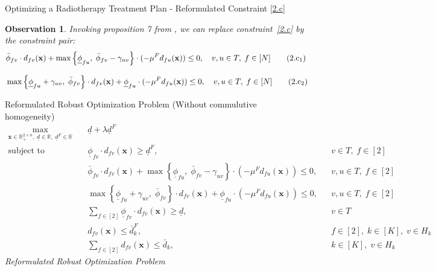 \documentclass[11pt]{beamer}
\newtheorem{customobservation}{Observation}
\begin{document}
\begin{frame}
        {Optimizing a Radiotherapy Treatment Plan - Reformulated Constraint \ref{2.c}}
        \vspace{1em}
        \small{
        \begin{customobservation}
        Invoking proposition 7 from \cite{apte2024robust}, we can replace constraint~\ref{2.c} by the constraint pair:
            \begin{align}
            & \bar{\phi}_{fv} \cdot d_{fv}(\mathbf{x}) +
            \max\left\{ \underline{\phi}_{fu},\; \bar{\phi}_{fv} - \gamma_{uv} \right\}
            \cdot (-\mu^F d_{fu}(\mathbf{x}))
            \le 0, \quad v, u \in T,\; f \in [N]
            \tag{$2.\text{c}_1$} \\[0.8em]
            & \max\left\{ \underline{\phi}_{fu} + \gamma_{uv},\; \bar{\phi}_{fv} \right\}
            \cdot d_{fv}(\mathbf{x}) +
            \underline{\phi}_{fu} \cdot (-\mu^F d_{fu}(\mathbf{x}))
            \le 0, \quad v, u \in T,\; f \in [N]
            \tag{$2.\text{c}_2$}
            \end{align}
        \end{customobservation}
        }
\end{frame}

\begin{frame}{Reformulated Robust Optimization Problem (Without commulutive homogeneity)}
    \vspace{-0.5em}
    \tiny{
    \begin{align}
    \max_{\mathbf{x} \in \mathbb{R}_+^{2 \times n},\; \underline{d} \in \mathbb{R},\; \underline{d}^F \in \mathbb{R}} \quad
    & \underline{d} + \lambda \underline{d}^F \tag{3.a} \\
    \text{subject to} \quad
    & \underline{\phi}_{fv} \cdot d_{fv}(\mathbf{x}) \ge \underline{d}^F,
    && v \in T,\; f \in [2] \tag{3.b} \label{3.b} \\[0.5em]
    & \bar{\phi}_{fv} \cdot d_{fv}(\mathbf{x}) +
    \max\left\{ \underline{\phi}_{fu},\; \bar{\phi}_{fv} - \gamma_{uv} \right\}
    \cdot (-\mu^F d_{fu}(\mathbf{x}))
    \le 0,
    && v,u \in T,\; f \in [2] \tag{3.c'} \\[0.5em]
    & \max\left\{ \underline{\phi}_{fu} + \gamma_{uv},\; \bar{\phi}_{fv} \right\}
    \cdot d_{fv}(\mathbf{x}) +
    \underline{\phi}_{fu} \cdot (-\mu^F d_{fu}(\mathbf{x}))
    \le 0,
    && v,u \in T,\; f \in [2] \tag{3.c''} \\[0.5em]
    & \sum_{f \in [2]} \underline{\phi}_{fv} \cdot d_{fv}(\mathbf{x}) \ge \underline{d},
    && v \in T \tag{3.d} \\[0.5em]
    & d_{fv}(\mathbf{x}) \le \bar{d}_k^F,
    && f \in [2],\; k \in [K],\; v \in H_k \tag{3.e} \\[0.5em]
    & \sum_{f \in [2]} d_{fv}(\mathbf{x}) \le \bar{d}_k,
    && k \in [K],\; v \in H_k \tag{3.f}
    \end{align}
    }
    \vspace{0.5em}
    \centering
    \textit{Reformulated Robust Optimization Problem}
    \end{frame}
\end{document}
